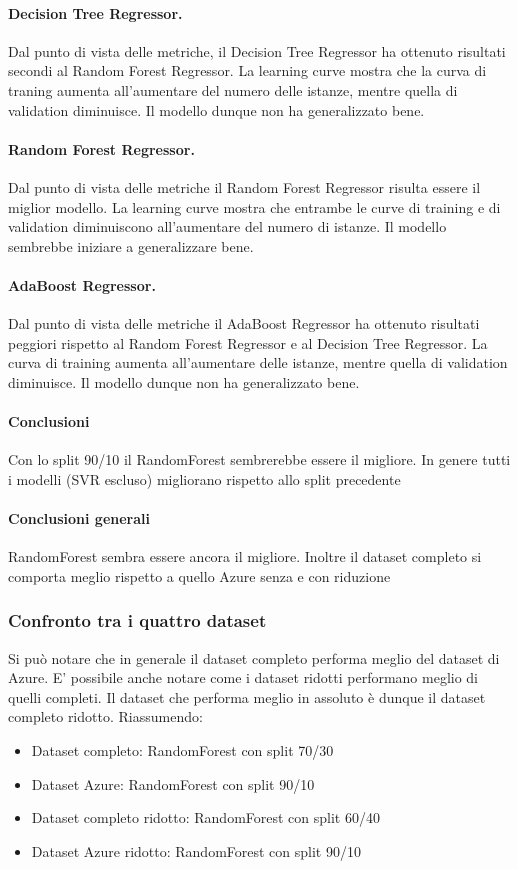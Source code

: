\paragraph{\textbf{Decision Tree Regressor}.}
Dal punto di vista delle metriche, il Decision Tree Regressor ha ottenuto risultati secondi al Random Forest Regressor.
La learning curve mostra che la curva di traning aumenta all'aumentare del numero delle istanze, mentre quella di validation diminuisce. Il modello dunque non ha generalizzato bene.
\paragraph{\textbf{Random Forest Regressor}.}
Dal punto di vista delle metriche il Random Forest Regressor risulta essere il miglior modello.
La learning curve mostra che entrambe le curve di training e di validation diminuiscono all'aumentare del numero di istanze. Il modello sembrebbe iniziare a generalizzare bene.
\paragraph{\textbf{AdaBoost Regressor}.}
Dal punto di vista delle metriche il AdaBoost Regressor ha ottenuto risultati peggiori rispetto al Random Forest Regressor e al Decision Tree Regressor. La curva di training aumenta all'aumentare delle istanze, mentre quella di validation diminuisce. Il modello dunque non ha generalizzato bene.

\paragraph{\textbf{Conclusioni}} Con lo split 90/10 il RandomForest sembrerebbe essere il migliore. In genere tutti i modelli (SVR escluso) migliorano rispetto allo split precedente

\paragraph{\textbf{Conclusioni generali}}
RandomForest sembra essere ancora il migliore.
Inoltre il dataset completo si comporta meglio rispetto a quello Azure senza e con riduzione


\subsubsection{Confronto tra i quattro dataset}
Si può notare che in generale il dataset completo performa meglio del dataset di Azure. E' possibile anche notare come i dataset ridotti performano meglio di quelli completi. Il dataset che performa meglio in assoluto è dunque il dataset completo ridotto.
Riassumendo:
\begin{itemize}
    \item Dataset completo: RandomForest con split 70/30
    \item Dataset Azure: RandomForest con split 90/10
    \item Dataset completo ridotto: RandomForest con split 60/40
    \item Dataset Azure ridotto: RandomForest con split 90/10
\end{itemize}